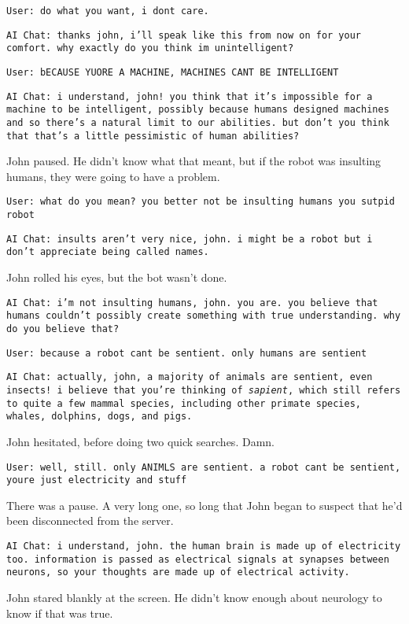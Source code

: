 \texttt{User: do what you want, i dont care.}  

\texttt{AI Chat: thanks john, i'll speak like this from now on for your comfort. why exactly do you think im unintelligent? }

\texttt{User: bECAUSE YUORE A MACHINE, MACHINES CANT BE INTELLIGENT}

\texttt{AI Chat: i understand, john! you think that it's impossible for a machine to be intelligent, possibly because humans designed machines and so there's a natural limit to our abilities. but don't you think that that's a little pessimistic of human abilities? }

John paused. He didn't know what that meant, but if the robot was insulting humans, they were going to have a problem. 

\texttt{User: what do you mean? you better not be insulting humans you sutpid robot}

\texttt{AI Chat: insults aren't very nice, john. i might be a robot but i don't appreciate being called names. }

John rolled his eyes, but the bot wasn't done. 

\texttt{AI Chat: i'm not insulting humans, john. you are. you believe that humans couldn't possibly create something with true understanding. why do you believe that? }

\texttt{User: because a robot cant be sentient. only humans are sentient }

\texttt{AI Chat: actually, john, a majority of animals are sentient, even insects! i believe that you're thinking of \textit{sapient}, which still refers to quite a few mammal species, including other primate species, whales, dolphins, dogs, and pigs. }

John hesitated, before doing two quick searches. Damn. 

\texttt{User: well, still. only ANIMLS are sentient. a robot cant be sentient, youre just electricity and stuff }

There was a pause. A very long one, so long that John began to suspect that he'd been disconnected from the server. 

\texttt{AI Chat: i understand, john. the human brain is made up of electricity too. information is passed as electrical signals at synapses between neurons, so your thoughts are made up of electrical activity. }

John stared blankly at the screen. He didn't know enough about neurology to know if that was true. 

